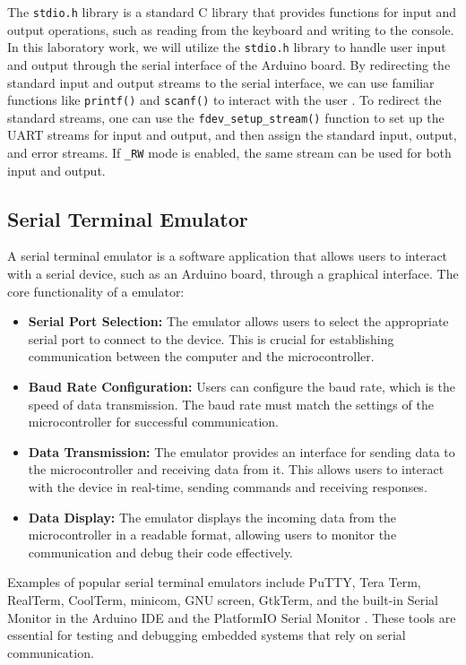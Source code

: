 The \texttt{stdio.h} library is a standard C library that provides functions for input and output operations, such as reading from the keyboard and writing to the console. In this laboratory work, we will utilize the \texttt{stdio.h} library to handle user input and output through the serial interface of the Arduino board. By redirecting the standard input and output streams to the serial interface, we can use familiar functions like \texttt{printf()} and \texttt{scanf()} to interact with the user \cite{stdio}. To redirect the standard streams, one can use the \texttt{fdev\_setup\_stream()} function to set up the UART streams for input and output, and then assign the standard input, output, and error streams. If \texttt{\_RW} mode is enabled, the same stream can be used for both input and output.

\subsection{Serial Terminal Emulator}

A serial terminal emulator is a software application that allows users to interact with a serial device, such as an Arduino board, through a graphical interface. The core functionality of a emulator:

\begin{itemize}
    \item \textbf{Serial Port Selection:} The emulator allows users to select the appropriate serial port to connect to the device. This is crucial for establishing communication between the computer and the microcontroller.
    \item \textbf{Baud Rate Configuration:} Users can configure the baud rate, which is the speed of data transmission. The baud rate must match the settings of the microcontroller for successful communication.
    \item \textbf{Data Transmission:} The emulator provides an interface for sending data to the microcontroller and receiving data from it. This allows users to interact with the device in real-time, sending commands and receiving responses.
    \item \textbf{Data Display:} The emulator displays the incoming data from the microcontroller in a readable format, allowing users to monitor the communication and debug their code effectively.
\end{itemize}

Examples of popular serial terminal emulators include PuTTY, Tera Term, RealTerm, CoolTerm, minicom, GNU screen, GtkTerm, and the built-in Serial Monitor in the Arduino IDE and the PlatformIO Serial Monitor \cite{toradex_serial_emulators}. These tools are essential for testing and debugging embedded systems that rely on serial communication. 

